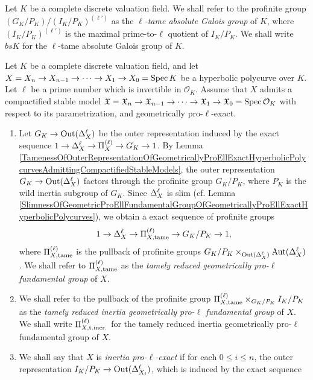 \begin{defn}
  Let $K$ be a complete discrete valuation field. We shall refer to the profinite group $(G_K/P_K)/(I_K/P_K)^{(\ell')}$ as the \emph{$\ell$-tame absolute Galois group} of $K$, where $(I_K/P_K)^{(\ell')}$ is the maximal prime-to-$\ell$ quotient of $I_K/P_K$. We shall write $bs{K}$ for the $\ell$-tame absolute Galois group of $K$.
\end{defn}

\begin{defn}
  Let $K$ be a complete discrete valuation field, and let $X = X_n \to X_{n - 1} \to \cdots \to X_1 \to X_0 = \mathrm{Spec} \, K$ be a hyperbolic polycurve over $K$. Let $\ell$ be a prime number which is invertible in $\mathcal{O}_K$. Assume that $X$ admits a compactified stable model $\mathfrak{X} = \mathfrak{X}_n \to \mathfrak{X}_{n - 1} \to \cdots \to \mathfrak{X}_1 \to \mathfrak{X}_0 = \mathrm{Spec} \, \mathcal{O}_K$ with respect to its parametrization, and geometrically pro-$\ell$-exact.
  \begin{enumerate}
    \item Let $G_K \to \mathrm{Out}(\Delta_{X}^\ell)$ be the outer representation induced by the exact sequence $1 \to \Delta_{X}^\ell \to \Pi^{(\ell)}_{X} \to G_K \to 1$. By Lemma \ref{TamenessOfOuterRepresentationOfGeometricallyProEllExactHyperbolicPolycurvesAdmittingCompactifiedStableModels}, the outer representation $G_K \to \mathrm{Out}(\Delta_{X}^\ell)$ factors through the profinite group $G_K/P_K$, where $P_K$ is the wild inertia subgroup of $G_K$. Since $\Delta_{X}^\ell$ is slim (cf. Lemma \ref{SlimnessOfGeometricProEllFundamentalGroupOfGeometricallyProEllExactHyperbolicPolycurves}), we obtain a exact sequence of profinite groups
    \[
      1 \to \Delta_{X}^\ell \to \Pi^{(\ell)}_{X, \mathrm{tame}} \to G_K/P_K \to 1,
    \]
    where $\Pi^{(\ell)}_{X, \mathrm{tame}}$ is the pullback of profinite groups $G_K/P_K \times_{\mathrm{Out}(\Delta_{X}^\ell)} \mathrm{Aut}(\Delta_{X}^\ell)$. We shall refer to $\Pi^{(\ell)}_{X, \mathrm{tame}}$ as the \emph{tamely reduced geometrically pro-$\ell$ fundamental group} of $X$.
    \item We shall refer to the pullback of the profinite group $\Pi^{(\ell)}_{X, \mathrm{tame}} \times_{G_K/P_K} I_K/P_K$ as the \emph{tamely reduced inertia geometrically pro-$\ell$ fundamental group} of $X$. We shall write $\Pi^{(\ell)}_{X, \mathrm{t. iner.}}$ for the tamely reduced inertia geometrically pro-$\ell$ fundamental group of $X$.
    \item We shall say that $X$ is \emph{inertia pro-$\ell$-exact} if for each $0 \leq i \leq n$, the outer representation $I_K/P_K \to \mathrm{Out}(\Delta_{X_i}^\ell)$, which is induced by the exact sequence

\end{enumerate}
\end{defn}
